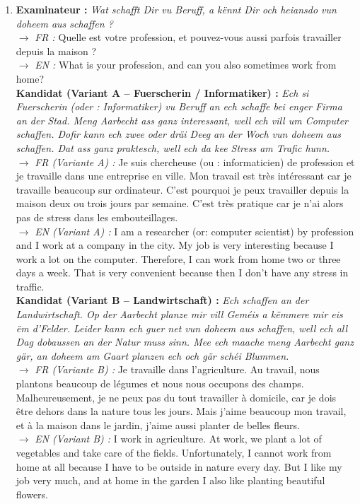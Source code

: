 \begin{enumerate}
    \item \textbf{Examinateur :} \textit{Wat schafft Dir vu Beruff, a kënnt Dir och heiansdo vun doheem aus schaffen ?} \\
    $\rightarrow$ \textit{FR :} Quelle est votre profession, et pouvez-vous aussi parfois travailler depuis la maison ? \\
    $\rightarrow$ \textit{EN :} What is your profession, and can you also sometimes work from home? \\
    \textbf{Kandidat (Variant A -- Fuerscherin / Informatiker) :} \textit{Ech si Fuerscherin (oder : Informatiker) vu Beruff an ech schaffe bei enger Firma an der Stad. Meng Aarbecht ass ganz interessant, well ech vill um Computer schaffen. Dofir kann ech zwee oder dräi Deeg an der Woch vun doheem aus schaffen. Dat ass ganz praktesch, well ech da kee Stress am Trafic hunn.} \\
    $\rightarrow$ \textit{FR (Variante A) :} Je suis chercheuse (ou : informaticien) de profession et je travaille dans une entreprise en ville. Mon travail est très intéressant car je travaille beaucoup sur ordinateur. C'est pourquoi je peux travailler depuis la maison deux ou trois jours par semaine. C'est très pratique car je n'ai alors pas de stress dans les embouteillages. \\
    $\rightarrow$ \textit{EN (Variant A) :} I am a researcher (or: computer scientist) by profession and I work at a company in the city. My job is very interesting because I work a lot on the computer. Therefore, I can work from home two or three days a week. That is very convenient because then I don't have any stress in traffic. \\
    \textbf{Kandidat (Variant B -- Landwirtschaft) :} \textit{Ech schaffen an der Landwirtschaft. Op der Aarbecht planze mir vill Geméis a këmmere mir eis ëm d'Felder. Leider kann ech guer net vun doheem aus schaffen, well ech all Dag dobaussen an der Natur muss sinn. Mee ech maache meng Aarbecht ganz gär, an doheem am Gaart planzen ech och gär schéi Blummen.} \\
    $\rightarrow$ \textit{FR (Variante B) :} Je travaille dans l'agriculture. Au travail, nous plantons beaucoup de légumes et nous nous occupons des champs. Malheureusement, je ne peux pas du tout travailler à domicile, car je dois être dehors dans la nature tous les jours. Mais j'aime beaucoup mon travail, et à la maison dans le jardin, j'aime aussi planter de belles fleurs. \\
    $\rightarrow$ \textit{EN (Variant B) :} I work in agriculture. At work, we plant a lot of vegetables and take care of the fields. Unfortunately, I cannot work from home at all because I have to be outside in nature every day. But I like my job very much, and at home in the garden I also like planting beautiful flowers.


\end{enumerate}
